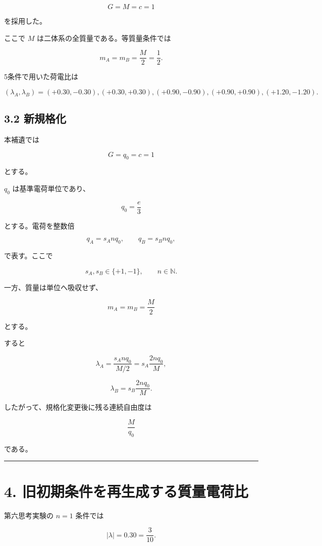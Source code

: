 \documentclass[
  a4paper,
]{ltjsarticle}
\begin{document}
\[
G=M=c=1
\]

を採用した。

ここで \(M\) は二体系の全質量である。等質量条件では

\[
m_A=m_B=\frac{M}{2}=\frac12.
\]

5条件で用いた荷電比は

\[
(\lambda_A,\lambda_B)
=
(+0.30,-0.30),
(+0.30,+0.30),
(+0.90,-0.90),
(+0.90,+0.90),
(+1.20,-1.20).
\]

\subsection{3.2 新規格化}\label{ux65b0ux898fux683cux5316}

本補遺では

\[
\boxed{G=q_0=c=1}
\]

とする。

\(q_0\) は基準電荷単位であり、

\[
q_0=\frac{e}{3}
\]

とする。電荷を整数倍

\[
q_A=s_A n q_0,
\qquad
q_B=s_B n q_0,
\]

で表す。ここで

\[
s_A,s_B\in\{+1,-1\},\qquad n\in\mathbb N.
\]

一方、質量は単位へ吸収せず、

\[
m_A=m_B=\frac{M}{2}
\]

とする。

すると

\[
\lambda_A
=
\frac{s_A n q_0}{M/2}
=
s_A\frac{2nq_0}{M},
\]

\[
\lambda_B
=
s_B\frac{2nq_0}{M}.
\]

したがって、規格化変更後に残る連続自由度は

\[
\boxed{\frac{M}{q_0}}
\]

である。

\begin{center}\rule{0.5\linewidth}{0.5pt}\end{center}

\section{4.
旧初期条件を再生成する質量電荷比}\label{ux65e7ux521dux671fux6761ux4ef6ux3092ux518dux751fux6210ux3059ux308bux8ceaux91cfux96fbux8377ux6bd4}

第六思考実験の \(n=1\) 条件では

\[
|\lambda|=0.30=\frac{3}{10}.
\]
\end{document}
